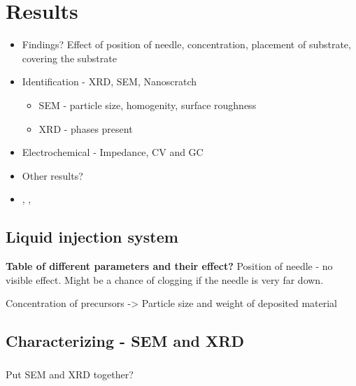 \documentclass[Main/main.tex]{subfiles}
\begin{document}
\newpage
\section{Results}




\begin{itemize}
    \item Findings? Effect of position of needle, concentration, placement of substrate, covering the substrate
    \item Identification - XRD, SEM, Nanoscratch
    \begin{itemize}
        \item SEM - particle size, homogenity, surface roughness
        \item XRD - phases present
    \end{itemize}
    \item Electrochemical - Impedance, CV and GC
    \item Other results?
    \item {}, , 
\end{itemize}

\subsection{Liquid injection system}

\textbf{Table of different parameters and their effect?}
Position of needle - no visible effect. Might be a chance of clogging if the needle is very far down.

Concentration of precursors -> Particle size and weight of deposited material

\subsection{Characterizing - SEM and XRD}

\subsubsection{}
	
Put SEM and XRD together?





\subsubsection{}
\end{document}
